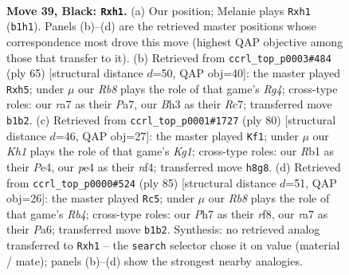 \documentclass[11pt]{article}
\begin{document}
\clearpage

\begin{figure}[p]\centering
\begin{subfigure}{0.46\textwidth}\centering
\resizebox{\linewidth}{!}{%
\newchessgame
\chessboard[
  setfen={7k/R4p1p/5rp1/3P4/1p2P3/5nPb/4K2P/1r5R b - - 3 39},
  showmover=false,
  pgfstyle=straightmove, color=movearrow, markmove={b1-h1}
]}
\caption{}
\end{subfigure}\hfill
\begin{subfigure}{0.46\textwidth}\centering
\resizebox{\linewidth}{!}{%
\newchessgame
\chessboard[
  setfen={8/p1r3pk/8/Pp3prP/3Rn3/B3PK1P/1R3P2/8 b - - 1 33},
  showmover=false,
  pgfstyle=straightmove, color=movearrow, markmove={g5-h5}
]}
\caption{}
\end{subfigure}
\\[4pt]
\begin{subfigure}{0.46\textwidth}\centering
\resizebox{\linewidth}{!}{%
\newchessgame
\chessboard[
  setfen={8/p3r1k1/1p1R1r2/2p2Bp1/4Pn2/2P5/P2R1P2/6K1 w - - 1 41},
  showmover=false,
  pgfstyle=straightmove, color=movearrow, markmove={g1-f1}
]}
\caption{}
\end{subfigure}\hfill
\begin{subfigure}{0.46\textwidth}\centering
\resizebox{\linewidth}{!}{%
\newchessgame
\chessboard[
  setfen={5R2/1pk5/p1n3r1/1r3pN1/3p1P2/PR4P1/2PK4/8 b - - 5 43},
  showmover=false,
  pgfstyle=straightmove, color=movearrow, markmove={b5-c5}
]}
\caption{}
\end{subfigure}
\caption{\textbf{Move 39, Black: \texttt{Rxh1}.} (a) Our position; Melanie plays \texttt{Rxh1} (\texttt{b1h1}). Panels (b)--(d) are the retrieved master positions whose correspondence most drove this move (highest QAP objective among those that transfer to it). (b) Retrieved from \texttt{ccrl\_top\_p0003\#484} (ply 65) [structural distance $d$=50, QAP obj=40]: the master played \texttt{Rxh5}; under $\mu$ our \emph{Rb8} plays the role of that game's \emph{Rg4}; cross-type roles: our \emph{r}a7 as their \emph{P}a7, our \emph{B}h3 as their \emph{R}c7; transferred move \texttt{b1b2}. (c) Retrieved from \texttt{ccrl\_top\_p0001\#1727} (ply 80) [structural distance $d$=46, QAP obj=27]: the master played \texttt{Kf1}; under $\mu$ our \emph{Kh1} plays the role of that game's \emph{Kg1}; cross-type roles: our \emph{R}b1 as their \emph{P}e4, our \emph{p}e4 as their \emph{n}f4; transferred move \texttt{h8g8}. (d) Retrieved from \texttt{ccrl\_top\_p0000\#524} (ply 85) [structural distance $d$=51, QAP obj=26]: the master played \texttt{Rc5}; under $\mu$ our \emph{Rb8} plays the role of that game's \emph{Rb4}; cross-type roles: our \emph{P}h7 as their \emph{r}f8, our \emph{r}a7 as their \emph{P}a6; transferred move \texttt{b1b2}. Synthesis: no retrieved analog transferred to \texttt{Rxh1} -- the \texttt{search} selector chose it on value (material / mate); panels (b)--(d) show the strongest nearby analogies.}
\label{fig:thought-m77}
\end{figure}
\end{document}
